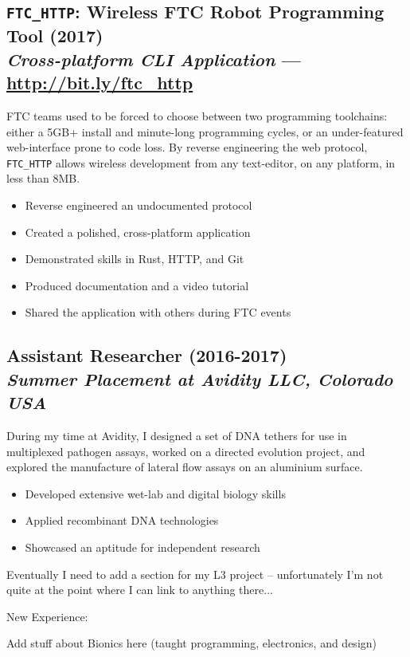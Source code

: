 \documentclass[twocolumn, a4paper, fontsize=9pt, headsepline, footsepline]{scrartcl}
\begin{document}
\subsection*{\textbf{\texttt{FTC\_HTTP}}: Wireless FTC Robot Programming Tool
  (2017)\\\textmd{\emph{Cross-platform CLI Application} — \url{http://bit.ly/ftc_http}}}
\noindent
FTC teams used to be forced to choose between two programming toolchains: either
a 5GB+ install and minute-long programming cycles, or an under-featured
web-interface prone to code loss. By reverse engineering the web protocol,
\texttt{FTC\_HTTP} allows wireless development from any text-editor, on any platform, in
less than 8MB.
\begin{itemize}
\item Reverse engineered an undocumented protocol
\item Created a polished, cross-platform application
\item Demonstrated skills in Rust, HTTP, and Git
\item Produced documentation and a video tutorial
\item Shared the application with others during FTC events
\end{itemize}

\subsection*{Assistant Researcher (2016-2017)\\\textmd{\emph{Summer Placement at Avidity LLC, Colorado USA}}}
\noindent
During my time at Avidity, I designed a set of DNA tethers for use in
multiplexed pathogen assays, worked on a directed evolution project, and
explored the manufacture of lateral flow assays on an aluminium surface.
\begin{itemize}
\item Developed extensive wet-lab and digital biology skills
\item Applied recombinant DNA technologies
\item Showcased an aptitude for independent research
\end{itemize}


Eventually I need to add a section for my L3 project – unfortunately I'm not
quite at the point where I can link to anything there...

New Experience:

Add stuff about Bionics here (taught programming, electronics, and design)
\end{document}
